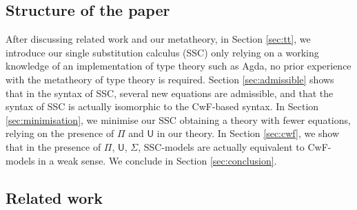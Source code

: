 \documentclass[a4paper,UKenglish,cleveref, autoref, thm-restate]{lipics-v2021}
\newcommand{\U}{\mathsf{U}}
\begin{document}
\subsection{Structure of the paper}

After discussing related work and our metatheory, in Section
\ref{sec:tt}, we introduce our single substitution calculus (SSC) only
relying on a working knowledge of an implementation of type theory
such as Agda, no prior experience with the metatheory of type theory
is required. Section \ref{sec:admissible} shows that in the syntax of
SSC, several new equations are admissible, and that the syntax of SSC
is actually isomorphic to the CwF-based syntax. In Section
\ref{sec:minimisation}, we minimise our SSC obtaining a theory with
fewer equations, relying on the presence of $\Pi$ and $\U$ in our
theory. In Section \ref{sec:cwf}, we show that in the presence of
$\Pi$, $\U$, $\Sigma$, SSC-models are actually equivalent to
CwF-models in a weak sense. We conclude in Section
\ref{sec:conclusion}.

\subsection{Related work}\label{sec:related}
\end{document}
